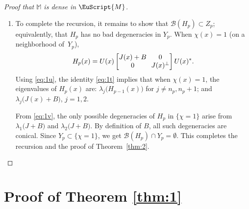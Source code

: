 \documentclass[JEP,XML,SOM,Unicode,NoFloatCountersInSection]{cedram}
\let\mathcal\mathscr
\let\pazocal\EuScript
\theoremstyle{definition}
\newcommand{\MM}{\pazocal{M}}
\newcommand{\BB}{\mathcal{B}}
\newcommand{\Mm}{\mathbb{M}}
\let\epsi\varepsilon
\newcommand{\matrice}[1]{\arraycolsep3.5pt\begin{bmatrix}#1\end{bmatrix}}
\begin{document}
\begin{proof}[Proof that $\Mm$ is dense in $\MM$]
\begin{enumerate}
The recursion assumption $d(H,H_{p-1}) \leq (1-2^{-p-1}) \epsi$ and $d(H_p,H_{p-1}) \leq 2^{-p} \epsi$ yield $d(H, H_p) \leq \bigl(1-2^{-p}\bigr) \epsi$. Moreover, $d(H_p,H_{p-1}) \leq \eta_0/8$ implies $\| H_p - H_{p-1} \|_{C^2} \leq \eta_0$. From Lemma \ref{lem:1c} and the recursion assumption $\BB(H_{p-1}) \subset Z_{p-1}$, $\BB(H_p) \subset Z_{p-1}$.

\item
To complete the recursion, it remains to show that $\BB(H_p) \subset Z_p$; equivalently, that $H_p$ has no bad degeneracies in $Y_p$. When $\chi(x) = 1$ (\ie on a neighborhood of~$Y_p$),
\begin{equation}\label{eq:1t}
H_p(x) = U(x) \matrice{J(x) + B & 0 \\ 0 & J(x)^\perp}U(x)^*.
\end{equation}
Using \eqref{eq:1u}, the identity \eqref{eq:1t} implies that when $\chi(x)=1$, the eigenvalues of $H_p(x)$ are: $\lambda_j\bigl( H_{p-1}(x) \bigr)$ for $j \neq n_p, n_p+1$; and $\lambda_j\bigl( J(x) + B \bigr)$, $j =1,2$.

From \eqref{eq:1v}, the only possible degeneracies of $H_p$ in $\{ \chi = 1 \}$ arise from $\lambda_1\bigl( J + B \bigr)$ and $\lambda_2\bigl( J + B \bigr)$. By definition of $B$, all such degeneracies are conical. Since $Y_p \subset \{ \chi=1\}$, we get $\BB(H_p) \cap Y_p = \emptyset$. This completes the recursion and the proof of Theorem~\ref{thm:2}.\qedhere
\end{enumerate}
\end{proof}

\section{Proof of Theorem \ref{thm:1}}\label{sec:4}
\end{document}
